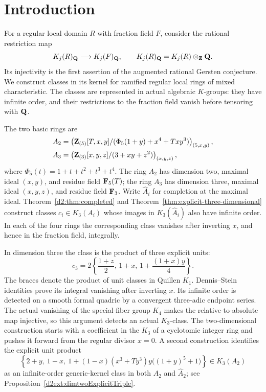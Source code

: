 \section{Introduction}\label{sec:introduction}

For a regular local domain $R$ with fraction field $F$, consider the
rational restriction map
\[
 K_j(R)_{\mathbf Q}\longrightarrow K_j(F)_{\mathbf Q},
 \qquad K_j(R)_{\mathbf Q}=K_j(R)\otimes_{\mathbf Z}\mathbf Q.
\]
Its injectivity is the first assertion of the augmented rational
Gersten conjecture. We construct classes in its kernel for ramified
regular local rings of mixed characteristic. The classes are represented
in actual algebraic $K$-groups: they have infinite order, and their
restrictions to the fraction field vanish before tensoring with $\mathbf Q$.

The two basic rings are
\begin{equation}\label{eq:intro-basic-rings}
\begin{aligned}
 A_2&=\left(\mathbf Z_{(5)}[T,x,y]/
       (\Phi_5(1+y)+x^4+Txy^3)\right)_{(5,x,y)},\\
 A_3&=\left(\mathbf Z_{(3)}[x,y,z]/(3+xy+z^2)\right)_{(x,y,z)},
\end{aligned}
\end{equation}
where $\Phi_5(t)=1+t+t^2+t^3+t^4$.
The ring $A_2$ has dimension two, maximal ideal $(x,y)$, and residue
field $\mathbf F_5(T)$; the ring $A_3$ has dimension three, maximal ideal
$(x,y,z)$, and residue field $\mathbf F_3$.
Write $\widehat A_i$ for completion at the maximal ideal.
Theorem~\ref{d2:thm:completed} and
Theorem~\ref{thm:explicit-three-dimensional} construct classes
$c_i\in K_3(A_i)$ whose images in $K_3(\widehat A_i)$ also have
infinite order. In each of the four rings the corresponding class
vanishes after inverting $x$, and hence in the fraction field,
integrally.

In dimension three the class is the product of three explicit units:
\begin{equation}\label{eq:intro-explicit-three}
 c_3=2\left\{\frac{1+z}{2},\,1+x,\,
                   1+\frac{(1+x)y}{4}\right\}.
\end{equation}
The braces denote the product of unit classes in Quillen $K_1$.
Dennis--Stein identities prove its integral vanishing after inverting
$x$. Its infinite order is detected on a smooth formal quadric by a
convergent three-adic endpoint series. The actual vanishing of the
special-fiber group $K_4$ makes the relative-to-absolute map injective,
so this argument detects an actual $K_3$-class.
The two-dimensional construction starts with a coefficient in the
$K_3$ of a cyclotomic integer ring and pushes it forward from the
regular divisor $x=0$. A second construction identifies the explicit
unit product
\[
 \left\{2+y,\ 1-x,\
 1+(1-x)(x^3+Ty^3)y\bigl((1+y)^5+1\bigr)\right\}
 \in K_3(A_2)
\]
as an infinite-order generic-kernel class in both $A_2$ and
$\widehat A_2$; see Proposition~\ref{d2ext:dimtwoExplicitTriple}.

